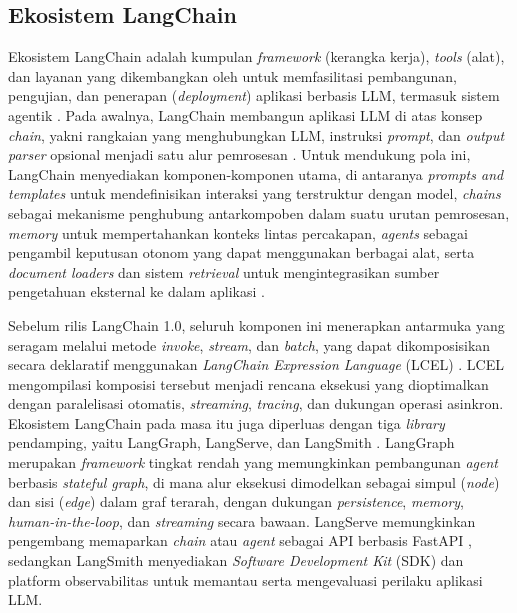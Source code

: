 \subsection{Ekosistem LangChain}
Ekosistem LangChain adalah kumpulan \textit{framework} (kerangka kerja), \textit{tools} (alat), dan layanan yang dikembangkan oleh \textcite{langchainaiLangChain2025} untuk memfasilitasi pembangunan, pengujian, dan penerapan (\textit{deployment}) aplikasi berbasis LLM, termasuk sistem agentik \parencite{narayanMasteringLangChainComprehensive2025}. Pada awalnya, LangChain membangun aplikasi LLM di atas konsep \textit{chain}, yakni rangkaian yang menghubungkan LLM, instruksi \textit{prompt}, dan \textit{output parser} opsional menjadi satu alur pemrosesan \parencite{oshinLearningLangchainBuilding2025}. Untuk mendukung pola ini, LangChain menyediakan komponen-komponen utama, di antaranya \textit{prompts and templates} untuk mendefinisikan interaksi yang terstruktur dengan model, \textit{chains} sebagai mekanisme penghubung antarkompoben dalam suatu urutan pemrosesan, \textit{memory} untuk mempertahankan konteks lintas percakapan, \textit{agents} sebagai pengambil keputusan otonom yang dapat menggunakan berbagai alat, serta \textit{document loaders} dan sistem \textit{retrieval} untuk mengintegrasikan sumber pengetahuan eksternal ke dalam aplikasi \parencite{narayanMasteringLangChainComprehensive2025}.

Sebelum rilis LangChain 1.0, seluruh komponen ini menerapkan antarmuka yang seragam melalui metode \textit{invoke}, \textit{stream}, dan \textit{batch}, yang dapat dikomposisikan secara deklaratif menggunakan \textit{LangChain Expression Language} (LCEL) \parencite{oshinLearningLangchainBuilding2025}. LCEL mengompilasi komposisi tersebut menjadi rencana eksekusi yang dioptimalkan dengan paralelisasi otomatis, \textit{streaming}, \textit{tracing}, dan dukungan operasi asinkron. Ekosistem LangChain pada masa itu juga diperluas dengan tiga \textit{library} pendamping, yaitu LangGraph, LangServe, dan LangSmith \parencite{narayanMasteringLangChainComprehensive2025}. LangGraph \parencite{langchainaiLangGraph2025} merupakan \textit{framework} tingkat rendah yang memungkinkan pembangunan \textit{agent} berbasis \textit{stateful graph}, di mana alur eksekusi dimodelkan sebagai simpul (\textit{node}) dan sisi (\textit{edge}) dalam graf terarah, dengan dukungan \textit{persistence}, \textit{memory}, \textit{human-in-the-loop}, dan \textit{streaming} secara bawaan. LangServe \parencite{langserve} memungkinkan pengembang memaparkan \textit{chain} atau \textit{agent} sebagai API berbasis FastAPI \parencite{fastapi}, sedangkan LangSmith \parencite{langchainaiLangSmithSDK2025} menyediakan \textit{Software Development Kit} (SDK) dan platform observabilitas untuk memantau serta mengevaluasi perilaku aplikasi LLM.

